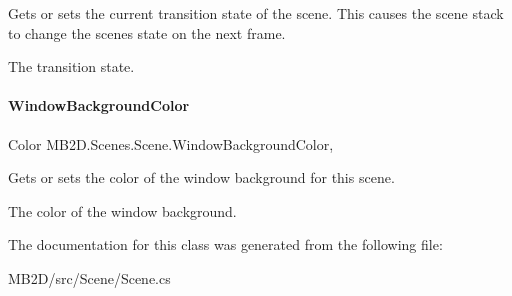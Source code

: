 Gets or sets the current transition state of the scene. This causes the scene stack to change the scenes state on the next frame. 

The transition state.\hypertarget{class_m_b2_d_1_1_scenes_1_1_scene_abfa7329c484e4af3153469eb278fcb69}{}\label{class_m_b2_d_1_1_scenes_1_1_scene_abfa7329c484e4af3153469eb278fcb69} 
\paragraph{\texorpdfstring{Window\+Background\+Color}{WindowBackgroundColor}}
{\footnotesize\ttfamily Color M\+B2\+D.\+Scenes.\+Scene.\+Window\+Background\+Color\hspace{0.3cm}{\ttfamily [get]}, {\ttfamily [set]}}



Gets or sets the color of the window background for this scene. 

The color of the window background.

The documentation for this class was generated from the following file\+:\begin{DoxyCompactItemize}
\item 
M\+B2\+D/src/\+Scene/Scene.\+cs\end{DoxyCompactItemize}
